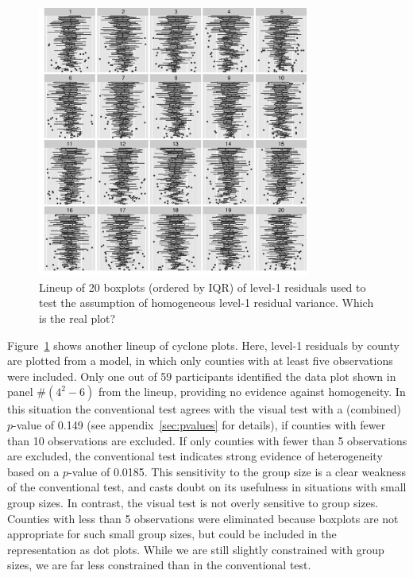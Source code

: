 \documentclass[12pt]{article} %
\newcommand{\hh}[1]{{\color{orange} #1}}
\begin{document}
\begin{figure}[hbt]
	\centering
	\includegraphics[width=0.8\textwidth]{radon_cyclone10.pdf}
	\caption{\label{fig:goodcyclone} Lineup of 20 boxplots (ordered by IQR) of level-1 residuals used to test the assumption of homogeneous level-1 residual variance.  Which is the real plot?}
\end{figure}

Figure~\ref{fig:goodcyclone} shows another lineup of cyclone plots. Here, level-1 residuals by county are plotted from a model, in which only counties with at least five observations were included. 
Only one out of  59 participants identified the data plot shown in panel \#$(4^2 - 6)$ from the lineup, providing no evidence against homogeneity. In this situation the conventional test agrees with the visual test with a (combined) $p$-value of 0.149 (see appendix~\ref{sec:pvalues} for details), if counties with fewer than 10 observations are excluded. If only counties with fewer than 5 observations are excluded, the conventional test indicates strong evidence of heterogeneity based on a $p$-value of 0.0185. This sensitivity to the group size is a clear weakness of the conventional test, and casts doubt on its usefulness in situations with small group sizes. In contrast, the visual test is not overly sensitive to group sizes. Counties with less than 5 observations were eliminated because boxplots are not appropriate for such small group sizes, \hh{but could be included in the representation as dot plots}. While we are still slightly constrained with group sizes, we are far less constrained than in the conventional test.
 
\end{document}
